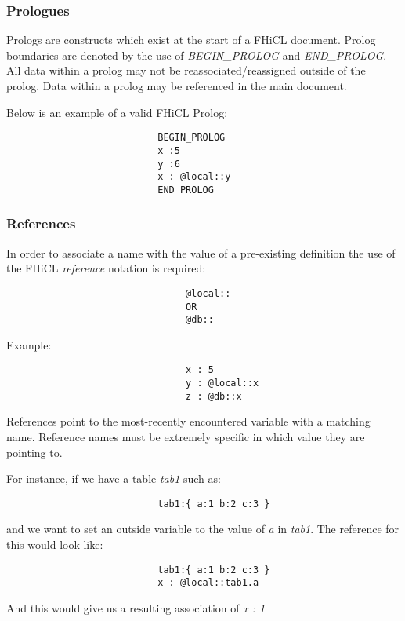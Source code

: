 \documentclass{article}
\begin{document}
                \subsubsection{Prologues}
                        Prologs are constructs which exist at the start of a FHiCL document.
                        Prolog boundaries are denoted by the use of \emph{BEGIN_PROLOG} and \emph{END_PROLOG}.
                        All data within a prolog may not be reassociated/reassigned outside of the prolog.
                        Data within a prolog may be referenced in the main document.
                        \par
                        Below is an example of a valid FHiCL Prolog:
                        \begin{verbatim}
                           BEGIN_PROLOG
                           x :5
                           y :6
                           x : @local::y
                           END_PROLOG
                        \end{verbatim}              
                \subsubsection{References}
                        In order to associate a name
                        with the value of a pre-existing definition 
                        the use of the FHiCL \emph{reference} notation is required:
                        \begin{verbatim}
                                @local::
                                OR
                                @db::
                        \end{verbatim}
                        Example:
                        \begin{verbatim}
                                x : 5
                                y : @local::x
                                z : @db::x
                        \end{verbatim}
                        \par
                        References point to the most-recently encountered variable
                        with a matching name.
                        Reference names must be extremely specific
                        in which value they are pointing to.
                        \par
                        For instance, if we have a table \emph{tab1} such as:
                        \begin{verbatim}
                           tab1:{ a:1 b:2 c:3 }
                        \end{verbatim}
                        and we want to set an outside variable to the value of \emph{a} in \emph{tab1}.
                        The reference for this would look like:
                        \begin{verbatim}
                           tab1:{ a:1 b:2 c:3 }
                           x : @local::tab1.a
                        \end{verbatim}
                        And this would give us a resulting association of \emph{x : 1}
\end{document}

